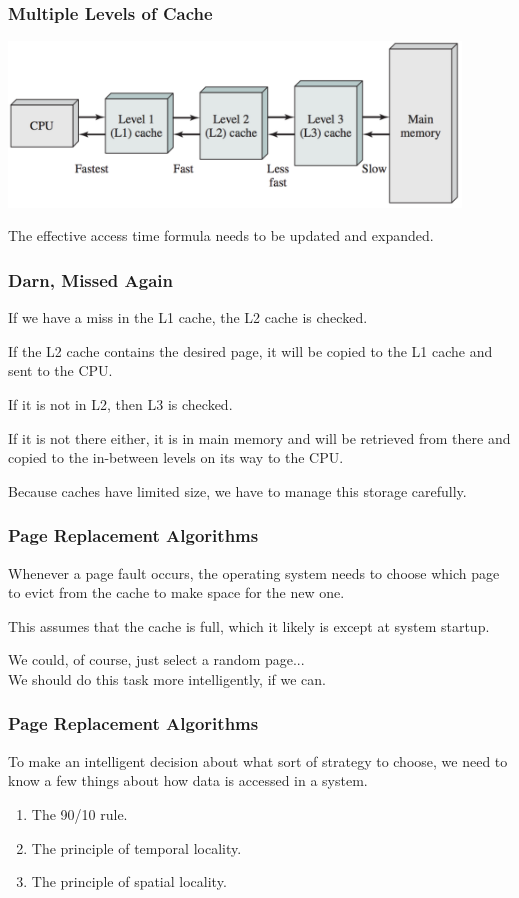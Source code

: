 \begin{frame}
\frametitle{Multiple Levels of Cache}

\begin{center}
\includegraphics[width=0.9\textwidth]{images/caches.png}
\end{center}

The effective access time formula needs to be updated and expanded.

\end{frame}

\begin{frame}
\frametitle{Darn, Missed Again}

If we have a miss in the L1 cache, the L2 cache is checked. 

If the L2 cache contains the desired page, it will be copied to the L1 cache and sent to the CPU. 

If it is not in L2, then L3 is checked. 

If it is not there either, it is in main memory and will be retrieved from there and copied to the in-between levels on its way to the CPU. 

Because caches have limited size, we have to manage this storage carefully.


\end{frame}

\begin{frame}
\frametitle{Page Replacement Algorithms}

Whenever a page fault occurs, the operating system needs to choose which page to \alert{evict} from the cache to make space for the new one. 

This assumes that the cache is full, which it likely is except at system startup. 

We could, of course, just select a random page...\\
\quad We should do this task more intelligently, if we can.

\end{frame}


\begin{frame}
\frametitle{Page Replacement Algorithms}
To make an intelligent decision about what sort of strategy to choose, we need to know a few things about how data is accessed in a system.



\begin{enumerate}
	\item The 90/10 rule.
	\item The principle of \alert{temporal locality}. 
	\item The principle of \alert{spatial locality}.
\end{enumerate}

\end{frame}

